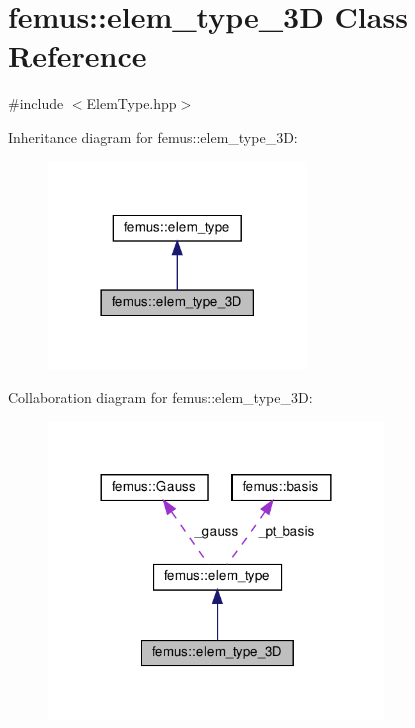 \hypertarget{classfemus_1_1elem__type__3_d}{}\section{femus\+:\+:elem\+\_\+type\+\_\+3D Class Reference}
\label{classfemus_1_1elem__type__3_d}


{\ttfamily \#include $<$Elem\+Type.\+hpp$>$}



Inheritance diagram for femus\+:\+:elem\+\_\+type\+\_\+3D\+:
\nopagebreak
\begin{figure}[H]
\begin{center}
\leavevmode
\includegraphics[width=194pt]{classfemus_1_1elem__type__3_d__inherit__graph}
\end{center}
\end{figure}


Collaboration diagram for femus\+:\+:elem\+\_\+type\+\_\+3D\+:
\nopagebreak
\begin{figure}[H]
\begin{center}
\leavevmode
\includegraphics[width=252pt]{classfemus_1_1elem__type__3_d__coll__graph}
\end{center}
\end{figure}
